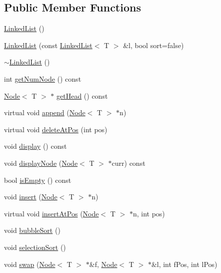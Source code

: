 \subsection*{Public Member Functions}
\begin{DoxyCompactItemize}
\item 
\hyperlink{classLinkedList_a3c20fcfec867e867f541061a09fc640c}{Linked\+List} ()
\item 
\hyperlink{classLinkedList_a6d0ec2b365564af3f855d245a85bcbef}{Linked\+List} (const \hyperlink{classLinkedList}{Linked\+List}$<$ T $>$ \&l, bool sort=false)
\item 
\hyperlink{classLinkedList_a7c37609df3b83bc4eb0281b852f93fd7}{$\sim$\+Linked\+List} ()
\item 
int \hyperlink{classLinkedList_ae04dbbcae32f8fb03dce3e174854981f}{get\+Num\+Node} () const 
\item 
\hyperlink{classNode}{Node}$<$ T $>$ $\ast$ \hyperlink{classLinkedList_af59e26b062e8e9549974adfa5bb51eb2}{get\+Head} () const 
\item 
virtual void \hyperlink{classLinkedList_ac2f92598858e9ba02af8722fba803c53}{append} (\hyperlink{classNode}{Node}$<$ T $>$ $\ast$n)
\item 
virtual void \hyperlink{classLinkedList_a62a89a30509d38b88c75177b8efa9a98}{delete\+At\+Pos} (int pos)
\item 
void \hyperlink{classLinkedList_afddb5dbcc39e687add40de41b975cd8d}{display} () const 
\item 
void \hyperlink{classLinkedList_a7ed3bb4986b76cbfd3547d0b262ffff3}{display\+Node} (\hyperlink{classNode}{Node}$<$ T $>$ $\ast$curr) const 
\item 
bool \hyperlink{classLinkedList_a1b28b1e19e5aa68f3d89352e307928f6}{is\+Empty} () const 
\item 
void \hyperlink{classLinkedList_a718246359a2199be67212703be951071}{insert} (\hyperlink{classNode}{Node}$<$ T $>$ $\ast$n)
\item 
virtual void \hyperlink{classLinkedList_aa7b12c5f9bb22be91012d68c9da0b431}{insert\+At\+Pos} (\hyperlink{classNode}{Node}$<$ T $>$ $\ast$n, int pos)
\item 
void \hyperlink{classLinkedList_aa644d66bfb879e71d1805a794a78b928}{bubble\+Sort} ()
\item 
void \hyperlink{classLinkedList_abd329a83adcec046dc482f7566cf91f4}{selection\+Sort} ()
\item 
void \hyperlink{classLinkedList_adea39e4b5d8f3fcb608c11f7746790ed}{swap} (\hyperlink{classNode}{Node}$<$ T $>$ $\ast$\&f, \hyperlink{classNode}{Node}$<$ T $>$ $\ast$\&l, int f\+Pos, int l\+Pos)
\end{DoxyCompactItemize}

